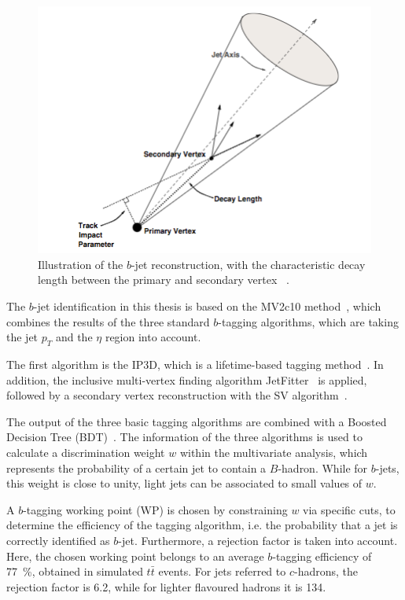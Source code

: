 \begin{figure}[h]
	\centering
	\includegraphics[width=0.5\linewidth]{Pics/btag.png}
	\caption{ Illustration of the $b$-jet reconstruction, with the characteristic decay length between the primary and secondary vertex ~\cite{ATLAS:2010rza}.} 
	\label{fig:42}
\end{figure}

The $b$-jet identification in this thesis is based on the MV2c10 method~\cite{ATL-PHYS-PUB-2016-012}, which combines the results of the three standard  $b$-tagging algorithms, which are taking the jet $p_T$ and the $\eta$ region into account.

 The first algorithm is the IP3D, which is a lifetime-based tagging method~\cite{ATL-PHYS-PUB-2016-012}. In addition, the inclusive multi-vertex finding algorithm JetFitter~\cite{Piacquadio:2008zza} is applied, followed by a secondary vertex reconstruction with the SV algorithm~\cite{ATLAS-CONF-2011-102}.

 The output of the three basic  tagging algorithms are combined with a Boosted Decision Tree (BDT)~\cite{ATL-PHYS-PUB-2016-012}. 
The information of the three algorithms is 
 used to calculate a discrimination weight $w$ within the multivariate analysis, which represents  the probability of a certain jet  to contain a $B$-hadron.  While for $b$-jets, this weight is close to unity, light jets can be associated to small values of $w$.


 
A $b$-tagging working point (WP) is chosen by constraining $w$ via specific cuts, to determine the efficiency of the tagging algorithm, i.e. the probability that a jet is correctly identified as $b$-jet. 
 Furthermore, a rejection factor is taken into account.  Here, the chosen working point belongs to an average $b$-tagging efficiency of 77~\%, obtained in simulated $t\bar{t}$ events. For jets referred to  $c$-hadrons, the rejection factor is 6.2, while for lighter flavoured  hadrons it is 134. 
 


